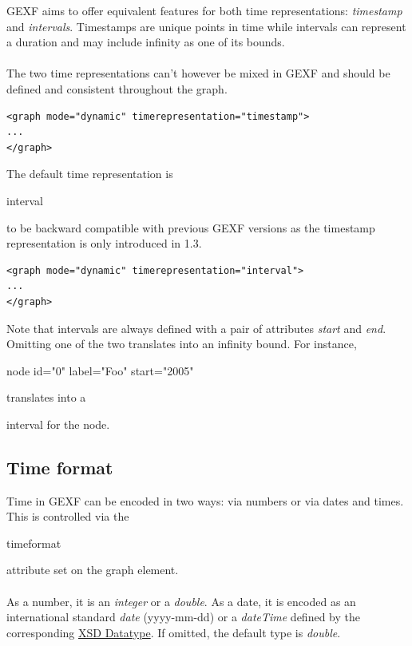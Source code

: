 \documentclass[a4paper,10pt]{article}
\begin{document}
GEXF aims to offer equivalent features for both time representations: \textit{timestamp} and \textit{intervals}. Timestamps are unique points in time while intervals can represent a duration and may include infinity as one of its bounds.

\paragraph{}
The two time representations can't however be mixed in GEXF and should be defined and consistent throughout the graph.

\lstset{ style=gexf }
\begin{lstlisting}[caption={Timestamp Time Representation}]
<graph mode="dynamic" timerepresentation="timestamp">
...
</graph>
\end{lstlisting}

The default time representation is \begin{footnotesize}interval\end{footnotesize} to be backward compatible with previous GEXF versions as the timestamp representation is only introduced in 1.3.

\lstset{ style=gexf }
\begin{lstlisting}[caption={Interval Time Representation}]
<graph mode="dynamic" timerepresentation="interval">
...
</graph>
\end{lstlisting}

Note that intervals are always defined with a pair of attributes \textit{start} and \textit{end}. Omitting one of the two translates into an infinity bound. For instance, \begin{footnotesize}node id="0" label="Foo" start="2005"\end{footnotesize} translates into a \begin{footnotesize}[2005, +INF]\end{footnotesize} interval for the node.

\subsection{Time format}

Time in GEXF can be encoded in two ways: via numbers or via dates and times. This is controlled via the \begin{footnotesize}timeformat\end{footnotesize} attribute set on the graph element.

\paragraph{}
As a number, it is an \textit{integer} or a \textit{double}. As a date, it is encoded as an international standard \textit{date} (yyyy-mm-dd) or a \textit{dateTime} defined by the corresponding \href{http://www.w3.org/TR/xmlschema-2/#dateTime}{XSD Datatype}. If omitted, the default type is \textit{double}.
\end{document}
